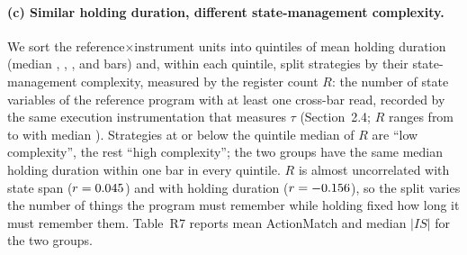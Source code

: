\documentclass[11pt,a4paper]{article}
\begin{document}
\paragraph{(c) Similar holding duration, different state-management complexity.} We sort the reference$\times$instrument units into quintiles of mean holding duration (median \RevDurQOneMedBars, \RevDurQTwoMedBars, \RevDurQThreeMedBars, \RevDurQFourMedBars{} and \RevDurQFiveMedBars{} bars) and, within each quintile, split strategies by their state-management complexity, measured by the register count $R$: the number of state variables of the reference program with at least one cross-bar read, recorded by the same execution instrumentation that measures $\tau$ (Section~2.4; $R$ ranges from \RevRegMin{} to \RevRegMax{} with median \RevRegMedian). Strategies at or below the quintile median of $R$ are ``low complexity'', the rest ``high complexity''; the two groups have the same median holding duration within one bar in every quintile. $R$ is almost uncorrelated with state span ($r=0.045$) and with holding duration ($r=-0.156$), so the split varies the number of things the program must remember while holding fixed how long it must remember them. Table~R7 reports mean ActionMatch and median $|IS|$ for the two groups.

\begin{landscape}
\begin{table}[p]\centering\scriptsize\setlength{\tabcolsep}{3.5pt}
\caption*{\textbf{Table R7.} Duration-matched comparison of low and high state-management complexity. Reference$\times$instrument units are sorted into quintiles of mean holding duration; within each quintile, strategies with register count $R$ at or below the quintile median (last column) are low complexity (L), the rest high (H). $n$ is the number of compiled runs; AM is mean ActionMatch; $\Delta$AM $=$ AM$_{\mathrm{L}}-$ AM$_{\mathrm{H}}$ with Welch $t$-statistic; med.\ $|IS|$ in bp. Low-cost models on all tasks ($N=\RevDurNLow$), frontier models on the 200-task subset ($N=\RevDurNFront$), four instruments pooled.}
\resizebox{\linewidth}{!}{}
\end{table}
\end{landscape}
\end{document}
